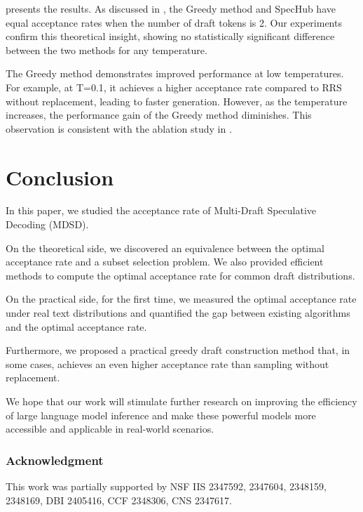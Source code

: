 \documentclass{article}
\makeatletter
\newcommand{\crvspace}{\@ifstar\crvspacestar\crvspacenostar}
\newcommand{\crvspacenostar}[1]{}
\newcommand{\crvspacestar}[1]{}
\makeatother
\begin{document}
 presents the results. As discussed in , the Greedy method and SpecHub have equal acceptance rates when the number of draft tokens is 2. Our experiments confirm this theoretical insight, showing no statistically significant difference between the two methods for any temperature.

The Greedy method demonstrates improved performance at low temperatures. For example, at T=0.1, it achieves a higher acceptance rate compared to RRS without replacement, leading to faster generation. However, as the temperature increases, the performance gain of the Greedy method diminishes. This observation is consistent with the ablation study in .






 \crvspace{-5pt}
\section{Conclusion}\label{se:conclusion}
\crvspace{-5pt}
In this paper, we studied the acceptance rate of Multi-Draft Speculative Decoding (MDSD). 

On the theoretical side, we discovered an equivalence between the optimal acceptance rate and a subset selection problem. We also provided efficient methods to compute the optimal acceptance rate for common draft distributions. 

On the practical side, for the first time, we measured the optimal acceptance rate under real text distributions and quantified the gap between existing algorithms and the optimal acceptance rate. 

Furthermore, we proposed a practical greedy draft construction method that, in some cases, achieves an even higher acceptance rate than sampling without replacement.

We hope that our work will stimulate further research on improving the efficiency of large language model inference and make these powerful models more accessible and applicable in real-world scenarios. 
\subsubsection*{Acknowledgment}
This work was partially supported by NSF IIS 2347592, 2347604, 2348159, 2348169, DBI 2405416, CCF 2348306, CNS 2347617.



\end{document}
